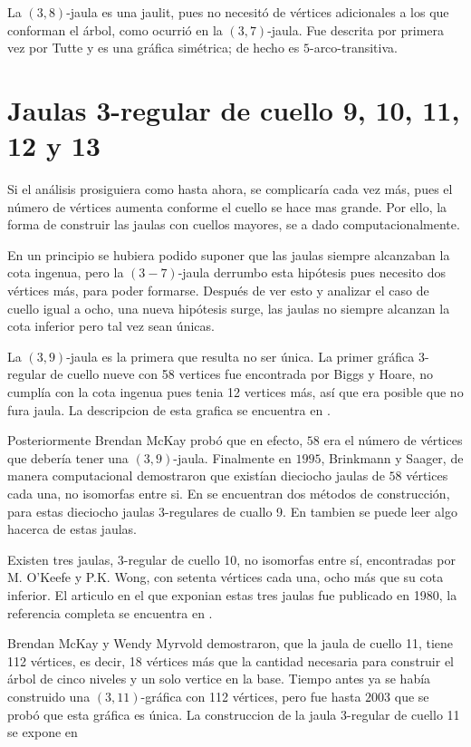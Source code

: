 \documentclass[12pt]{book}
\theoremstyle{definition}
\begin{document}
La $(3,8)$-jaula es una jaulit, pues no necesitó
de vértices adicionales a los que conforman el árbol, como ocurrió en la $(3,7)$-jaula. Fue
descrita por primera vez por Tutte y es una gráfica simétrica; de
hecho es $5$-arco-transitiva.

\section{Jaulas 3-regular de cuello 9, 10, 11, 12 y 13 }

Si el análisis prosiguiera como hasta ahora, se complicaría cada vez
más, pues el número de vértices aumenta conforme el cuello se hace mas
grande. Por ello, la forma de construir las jaulas con cuellos
mayores, se a dado computacionalmente.

En un principio se hubiera podido suponer que las jaulas siempre
alcanzaban la cota ingenua, pero la $(3-7)$-jaula derrumbo esta
hipótesis pues necesito dos vértices más, para poder
formarse. Después de ver esto y analizar el caso de cuello igual a
ocho, una nueva hipótesis surge, las jaulas no siempre alcanzan la
cota inferior pero tal vez sean únicas.

La $(3,9)$-jaula es la primera que resulta no ser única. La primer
gráfica 3-regular de cuello nueve con 58 vertices
fue encontrada por Biggs y Hoare, no cumplía con la cota ingenua pues
tenia 12 vertices más, así que era posible que no fura jaula. La
descripcion de esta grafica se encuentra en \cite{primerascuello9}.

Posteriormente Brendan McKay probó que en efecto, $58$ era
el número de vértices que debería tener una $(3,9)$-jaula. Finalmente en $1995$, Brinkmann y Saager, de manera computacional
demostraron que existían dieciocho jaulas de $58$ vértices cada una,
no isomorfas entre si. En \cite{cuello9} se encuentran dos métodos de
construcción, para estas dieciocho jaulas 3-regulares de cuallo 9. En
\cite{cuello9y11} tambien se puede leer algo hacerca de estas jaulas.

Existen tres jaulas, 3-regular de cuello 10, no isomorfas entre sí,
encontradas por M. O'Keefe y P.K. Wong, con setenta vértices cada una,
ocho más que su cota inferior. El articulo en el que exponian estas
tres jaulas fue publicado en 1980, la referencia completa se encuentra
en \cite{cuello10}.

Brendan McKay y Wendy Myrvold demostraron, que la jaula de cuello
11, tiene 112 vértices, es decir, 18 vértices más
que la cantidad necesaria para construir el árbol de cinco niveles y
un solo vertice en la base. Tiempo antes ya se
había construido una $(3,11)$-gráfica con 112 vértices, pero fue hasta
$2003$ que se probó que esta gráfica es única. La construccion de la
jaula 3-regular de cuello 11 se expone en \cite{cuello9y11}
\end{document}
